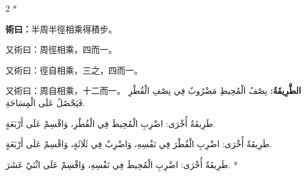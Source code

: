 \documentclass[11pt,a4paper]{article}
\newcommand{\ar}[1]{\arabicfont\beginR #1\endR}
\newenvironment{bilingual}{%
  \begin{paracol}{2}%
  \switchcolumn[0]*%
}{%
  \end{paracol}%
}
\newcommand{\cnline}[1]{\switchcolumn[0]\noindent #1 \switchcolumn[1]}
\newcommand{\arline}[1]{\noindent\ar{#1} \switchcolumn[0]*}
\newenvironment{prob bilingual}{%
  \begin{paracol}{2}%
  \switchcolumn[0]*%
}{%
  \end{paracol}%
  \vspace{0.3em}%
}
\begin{document}
\begin{bilingual}
\cnline{%
\textcolor{methodcolor}{\textbf{術曰：}}半周半徑相乘得積步。

又術曰：周徑相乘，四而一。

又術曰：徑自相乘，三之，四而一。

又術曰：周自相乘，十二而一。
}
\arline{%
\textcolor{methodcolor}{\textbf{الطَّرِيقَةُ:}} نِصْفُ الْمُحِيطِ مَضْرُوبٌ فِي نِصْفِ الْقُطْرِ فَيَحْصُلُ عَلَى الْمِسَاحَةِ.

طَرِيقَةٌ أُخْرَى: اضْرِبِ الْمُحِيطَ فِي الْقُطْرِ، وَاقْسِمْ عَلَى أَرْبَعَةٍ.

طَرِيقَةٌ أُخْرَى: اضْرِبِ الْقُطْرَ فِي نَفْسِهِ، وَاضْرِبْ فِي ثَلَاثَةٍ، وَاقْسِمْ عَلَى أَرْبَعَةٍ.

طَرِيقَةٌ أُخْرَى: اضْرِبِ الْمُحِيطَ فِي نَفْسِهِ، وَاقْسِمْ عَلَى اثْنَيْ عَشَرَ.
}
\end{bilingual}
\end{document}
